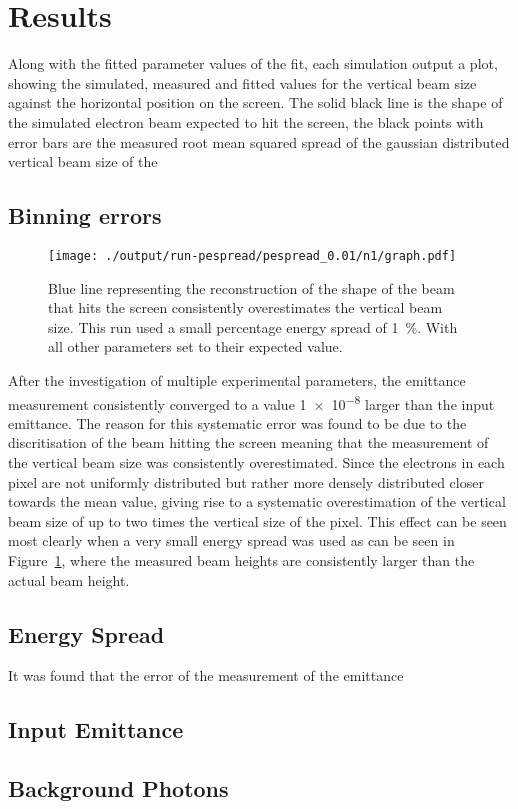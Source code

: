 
\section{Results}
\label{sec:results}

Along with the fitted parameter values of the fit, each simulation output a
plot, showing the simulated, measured and fitted values for the vertical beam
size against the horizontal position on the screen. The solid black line is the
shape of the simulated electron beam expected to hit the screen, the black
points with error bars are the
measured root mean squared spread of the gaussian distributed vertical beam size
of the

\subsection{Binning errors}

\begin{figure}[tb]
	\centering
	\texttt{[image: ./output/run-pespread/pespread\_0.01/n1/graph.pdf]}
	\caption{
		Blue line representing the reconstruction of the shape of the beam that
		hits the screen consistently overestimates the vertical beam size. This
		run used a small percentage energy spread of \SI{1}{\percent}. With all
		other parameters set to their expected value.
	}
	\label{fig:yoverestimate}
\end{figure}

After the investigation of multiple experimental parameters, the emittance
measurement consistently converged to a value \num{1e-8} larger than the input
emittance. The reason for this systematic error was found to be due to the
discritisation of the beam hitting the screen meaning that the measurement of
the vertical beam size was consistently overestimated. Since the electrons in
each pixel are not uniformly distributed but rather more densely distributed
closer towards the mean value, giving rise to a systematic overestimation of the
vertical beam size of up to two times the vertical size of the pixel. This
effect can be seen most clearly when a very small energy spread was used as can
be seen in Figure~\ref{fig:yoverestimate}, where the measured beam heights are
consistently larger than the actual beam height.


\subsection{Energy Spread}

It was found that the error of the measurement of the emittance 

\subsection{Input Emittance}



\subsection{Background Photons}
